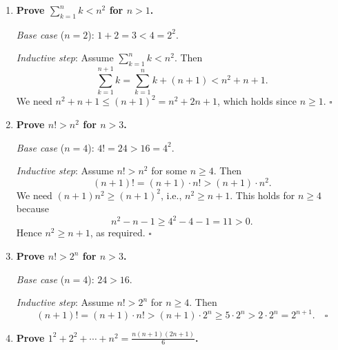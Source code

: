 \begin{enumerate}[{0.}1. ]
\textit{Base case} ($n=1$): $1^3 = 1 = \frac{1\cdot 4}{4}$. \checkmark

\textit{Inductive step}: Assume $\sum_{k=1}^n k^3 = \frac{n^2(n+1)^2}{4}$. Then
\begin{align*}
\sum_{k=1}^{n+1} k^3 &= \frac{n^2(n+1)^2}{4} + (n+1)^3\\
&= \frac{n^2(n+1)^2 + 4(n+1)^3}{4}\\
&= \frac{(n+1)^2(n^2 + 4(n+1))}{4}\\
&= \frac{(n+1)^2(n^2+4n+4)}{4}\\
&= \frac{(n+1)^2(n+2)^2}{4}.
\end{align*}
This is the formula with $n$ replaced by $n+1$. $\square$

\item \textbf{Prove $\sum_{k=1}^n k < n^2$ for $n > 1$.}

\textit{Base case} ($n=2$): $1+2=3 < 4=2^2$. \checkmark

\textit{Inductive step}: Assume $\sum_{k=1}^n k < n^2$. Then
\[
\sum_{k=1}^{n+1} k = \sum_{k=1}^n k + (n+1) < n^2 + n + 1.
\]
We need $n^2 + n + 1 \leq (n+1)^2 = n^2+2n+1$, which holds since $n \geq 1$. $\square$

\item \textbf{Prove $n! > n^2$ for $n > 3$.}

\textit{Base case} ($n=4$): $4! = 24 > 16 = 4^2$. \checkmark

\textit{Inductive step}: Assume $n! > n^2$ for some $n \geq 4$. Then
\[
(n+1)! = (n+1)\cdot n! > (n+1)\cdot n^2.
\]
We need $(n+1)n^2 \geq (n+1)^2$, i.e., $n^2 \geq n+1$. This holds for
$n \geq 4$ because
\[
n^2-n-1 \geq 4^2-4-1 = 11 > 0.
\]
Hence $n^2 \geq n+1$, as required. $\square$

\item \textbf{Prove $n! > 2^n$ for $n > 3$.}

\textit{Base case} ($n=4$): $24 > 16$. \checkmark

\textit{Inductive step}: Assume $n! > 2^n$ for $n \geq 4$. Then
\[
(n+1)! = (n+1)\cdot n! > (n+1)\cdot 2^n \geq 5\cdot 2^n > 2 \cdot 2^n = 2^{n+1}. \quad\square
\]

\item \textbf{Prove $1^2+2^2+\cdots+n^2 = \frac{n(n+1)(2n+1)}{6}$.}


\end{enumerate}
